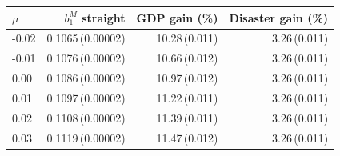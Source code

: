 \begin{tabular}{@{}lrrr@{}}
\toprule
$\mu$ & $b_1^M$ straight & GDP gain (\%) & Disaster gain (\%) \\ \midrule
-0.02 & 0.1065\,(0.00002) & 10.28\,(0.011) & 3.26\,(0.011) \\
-0.01 & 0.1076\,(0.00002) & 10.66\,(0.012) & 3.26\,(0.011) \\
0.00 & 0.1086\,(0.00002) & 10.97\,(0.012) & 3.26\,(0.011) \\
0.01 & 0.1097\,(0.00002) & 11.22\,(0.011) & 3.26\,(0.011) \\
0.02 & 0.1108\,(0.00002) & 11.39\,(0.011) & 3.26\,(0.011) \\
0.03 & 0.1119\,(0.00002) & 11.47\,(0.012) & 3.26\,(0.011) \\
\bottomrule
\end{tabular}
